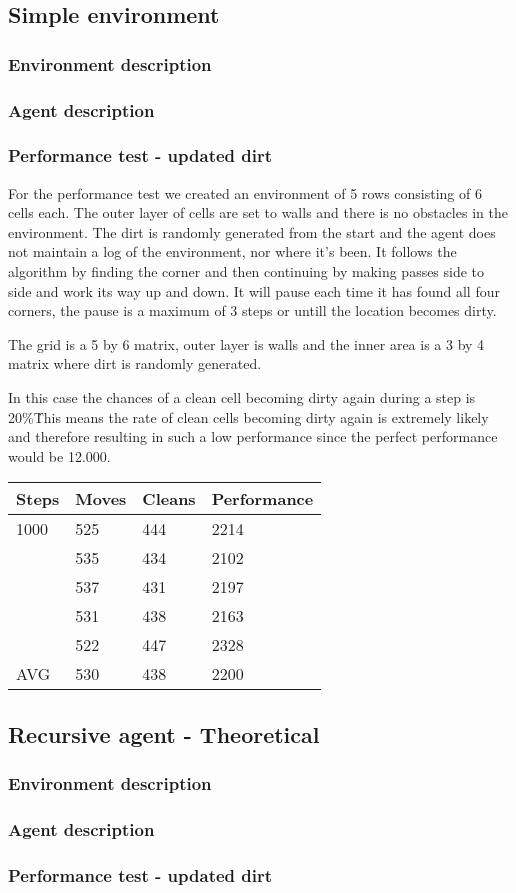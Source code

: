 \subsection{Simple environment}
\subsubsection{Environment description}

\subsubsection{Agent description}

\subsubsection{Performance test - updated dirt}
For the performance test we created an environment of 5 rows consisting of 6
cells each.  The outer layer of cells are set to walls and there is no obstacles
in the environment.  The dirt is randomly generated from the start and the agent
does not maintain a log of the environment, nor where it's been. It follows the
algorithm by finding the corner and then continuing by making passes side to
side and work its way up and down.  It will pause each time it has found all
four corners, the pause is a maximum of 3 steps or untill the location becomes
dirty.

The grid is a 5 by 6 matrix, outer layer is walls and the inner area is a 3 by 4
matrix where dirt is randomly generated.

In this case the chances of a clean cell becoming dirty again during a step is
20\%\.  This means the rate of clean cells becoming dirty again is extremely
likely and therefore resulting in such a low performance since the perfect
performance would be 12.000.

\begin{longtable}{ p{} p{} p{} 
									 p{} }
Steps & Moves & Cleans	& Performance \\\hline
1000	& 525 & 444 & 2214 \\
 		 	& 535 & 434 & 2102 \\
 			& 537 & 431 & 2197 \\
 			& 531 & 438 & 2163 \\
 			& 522 & 447 & 2328 \\\hline
AVG		& 530 & 438 &	2200 \\\hline
\end{longtable}


\subsection{Recursive agent - Theoretical}
\subsubsection{Environment description}

\subsubsection{Agent description}

\subsubsection{Performance test - updated dirt}


